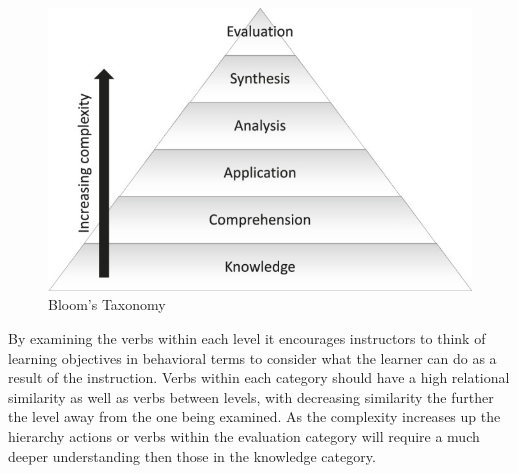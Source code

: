 \begin{figure}[H]
\centering
  \includegraphics[width=\textwidth]{images/bloom.jpg}
  \caption{Bloom's Taxonomy}
  \label{fig:bloom}
\end{figure}

\noindent
By examining the verbs within each level it encourages instructors to think of learning objectives in behavioral terms to consider what the learner can do as a result of the instruction. \cite{Adams2015} Verbs within each category should have a high relational similarity as well as verbs between levels, with decreasing similarity the further the level away from the one being examined. As the complexity increases up the hierarchy actions or verbs within the evaluation category will require a much deeper understanding then those in the knowledge category.